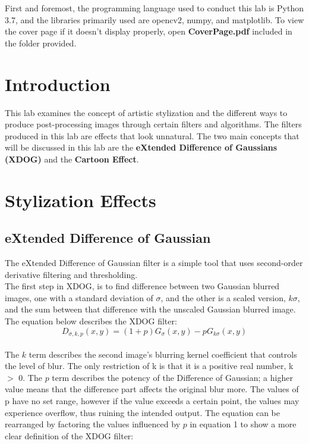\documentclass{article}
\begin{document}
	
	
	
	First and foremost, the programming language used to conduct this lab is Python 3.7, and the libraries primarily used are opencv2, numpy, and matplotlib. To view the cover page if it doesn't display properly, open \textbf{CoverPage.pdf} included in the folder provided.\\
	
	\section{Introduction}
	
	This lab examines the concept of artistic stylization and the different ways to produce post-processing images through certain filters and algorithms. The filters produced in this lab are effects that look unnatural. The two main concepts that will be discussed in this lab are the \textbf{eXtended Difference of Gaussians (XDOG)} and the \textbf{Cartoon Effect}.\\
	
	\section{Stylization Effects}
	
	\subsection{eXtended Difference of Gaussian}
	
	The eXtended Difference of Gaussian filter is a simple tool that uses second-order derivative filtering and thresholding.\\
	
	The first step in XDOG, is to find difference between two Gaussian blurred images, one with a standard deviation of $\sigma$, and the other is a scaled version, $k\sigma$, and the sum between that difference with the unscaled Gaussian blurred image. The equation below describes the XDOG filter:\\
	
	\begin{equation}
	D_{\sigma,k,p}(x,y) = (1 + p)G_{\sigma}(x,y) - pG_{k\sigma}(x,y)
	\end{equation}\\
	
	The $k$ term describes the second image's blurring kernel coefficient that controls the level of blur. The only restriction of k is that it is a positive real number, k $>$ 0. The $p$ term describes the potency of the Difference of Gaussian; a higher value means that the difference part affects the original blur more. The values of p have no set range, however if the value exceeds a certain point, the values may experience overflow, thus ruining the intended output. The equation can be rearranged by factoring the values influenced by $p$ in equation 1 to show a more clear definition of the XDOG filter:\\
	
\end{document}
